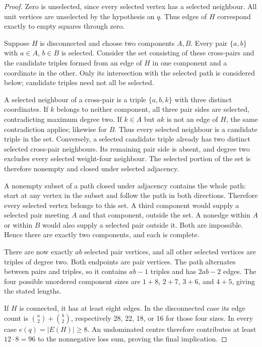 \documentclass[11pt,a4paper]{article}
\theoremstyle{definition}
\theoremstyle{remark}
\begin{document}
\begin{proof}
Zero is unselected, since every selected vertex has a selected neighbour.
All unit vertices are unselected by the hypothesis on $q$. Thus edges of
$H$ correspond exactly to empty squares through zero.

Suppose $H$ is disconnected and choose two components $A,B$.
Every pair $\{a,b\}$ with $a\in A$, $b\in B$ is selected. Consider the
set consisting of these cross-pairs and the candidate triples formed
from an edge of $H$ in one component and a coordinate in the other.
Only its intersection with the selected path is considered below;
candidate triples need not all be selected.

A selected neighbour of a cross-pair is a triple $\{a,b,k\}$ with three
distinct coordinates. If $k$ belongs to neither component, all three
pair sides are selected, contradicting maximum degree two. If $k\in A$
but $ak$ is not an edge of $H$, the same contradiction applies; likewise
for $B$. Thus every selected neighbour is a candidate triple in the set.
Conversely, a selected candidate triple already has two distinct selected
cross-pair neighbours. Its remaining pair side is absent, and degree two
excludes every selected weight-four neighbour. The selected portion of
the set is therefore nonempty and closed under selected adjacency.

A nonempty subset of a path closed under adjacency contains the whole
path: start at any vertex in the subset and follow the path in both
directions. Therefore every selected vertex belongs to this set.
A third component would supply a selected pair meeting $A$ and that
component, outside the set. A nonedge within $A$ or within $B$ would also
supply a selected pair outside it. Both are impossible. Hence there are
exactly two components, and each is complete.

There are now exactly $ab$ selected pair vertices, and all other selected
vertices are triples of degree two. Both endpoints are pair vertices.
The path alternates between pairs and triples, so it contains $ab-1$
triples and has $2ab-2$ edges. The four possible unordered component sizes
are $1+8$, $2+7$, $3+6$, and $4+5$, giving the stated lengths.

If $H$ is connected, it has at least eight edges. In the disconnected
case its edge count is $\binom a2+\binom b2$, respectively 28, 22, 18,
or 16 for those four sizes. In every case $e(q)=|E(H)|\ge8$.
An undominated centre therefore contributes at least $12\cdot8=96$ to
the nonnegative loss sum, proving the final implication.
\end{proof}
\end{document}
